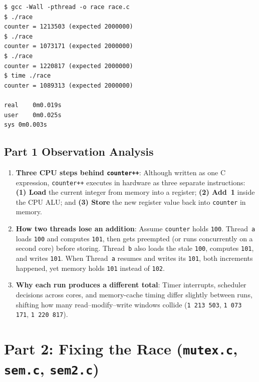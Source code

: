 \documentclass[12pt,a4paper]{article}
\begin{document}
\begin{lstlisting}[style=consolestyle]
$ gcc -Wall -pthread -o race race.c
$ ./race
counter = 1213503 (expected 2000000)
$ ./race
counter = 1073171 (expected 2000000)
$ ./race
counter = 1220817 (expected 2000000)
$ time ./race
counter = 1089313 (expected 2000000)

real	0m0.019s
user	0m0.025s
sys	0m0.003s
\end{lstlisting}

\subsection{Part 1 Observation Analysis}
\begin{enumerate}
    \item \textbf{Three CPU steps behind \texttt{counter++}}: Although written as one C expression, \texttt{counter++} executes in hardware as three separate instructions: \textbf{(1) Load} the current integer from memory into a register; \textbf{(2) Add~1} inside the CPU ALU; and \textbf{(3) Store} the new register value back into \texttt{counter} in memory.
    \item \textbf{How two threads lose an addition}: Assume \texttt{counter} holds \texttt{100}. Thread~\texttt{a} loads \texttt{100} and computes \texttt{101}, then gets preempted (or runs concurrently on a second core) before storing. Thread~\texttt{b} also loads the stale \texttt{100}, computes \texttt{101}, and writes \texttt{101}. When Thread~\texttt{a} resumes and writes its \texttt{101}, both increments happened, yet memory holds \texttt{101} instead of \texttt{102}.
    \item \textbf{Why each run produces a different total}: Timer interrupts, scheduler decisions across cores, and memory-cache timing differ slightly between runs, shifting how many read--modify--write windows collide (\texttt{1\,213\,503}, \texttt{1\,073\,171}, \texttt{1\,220\,817}).
\end{enumerate}

\section{Part 2: Fixing the Race (\texttt{mutex.c}, \texttt{sem.c}, \texttt{sem2.c})}
\end{document}
